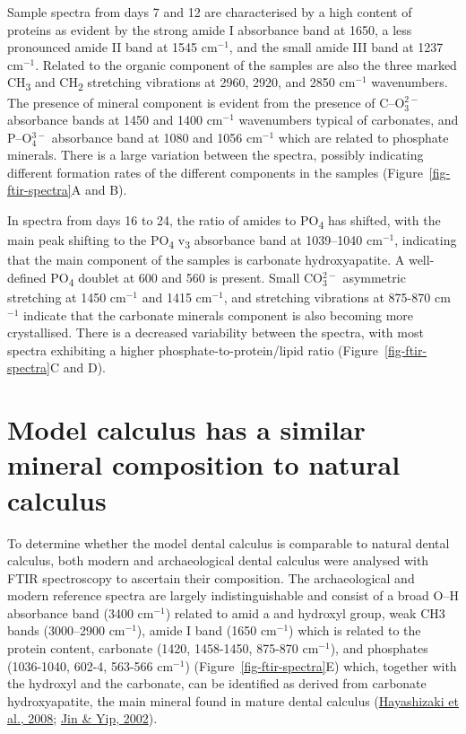 \documentclass[
  letterpaper,
]{book}
\begin{document}
Sample spectra from days 7 and 12 are characterised by a high content of
proteins as evident by the strong amide I absorbance band at 1650, a
less pronounced amide II band at 1545 cm\(^{-1}\), and the small amide
III band at 1237 cm\(^{-1}\). Related to the organic component of the
samples are also the three marked CH\textsubscript{3} and
CH\textsubscript{2} stretching vibrations at 2960, 2920, and 2850
cm\(^{-1}\) wavenumbers. The presence of mineral component is evident
from the presence of C--O\(^{2-}_3\) absorbance bands at 1450 and 1400
cm\(^{-1}\) wavenumbers typical of carbonates, and P--O\(^{3-}_4\)
absorbance band at 1080 and 1056 cm\(^{-1}\) which are related to
phosphate minerals. There is a large variation between the spectra,
possibly indicating different formation rates of the different
components in the samples (Figure~\ref{fig-ftir-spectra}A and B).

In spectra from days 16 to 24, the ratio of amides to
PO\textsubscript{4} has shifted, with the main peak shifting to the
PO\textsubscript{4} v\textsubscript{3} absorbance band at 1039--1040
cm\(^{-1}\), indicating that the main component of the samples is
carbonate hydroxyapatite. A well-defined PO\textsubscript{4} doublet at
600 and 560 is present. Small CO\(_3^{2-}\) asymmetric stretching at
1450 cm\(^{-1}\) and 1415 cm\(^{-1}\), and stretching vibrations at
875-870 cm\(^{-1}\) indicate that the carbonate minerals component is
also becoming more crystallised. There is a decreased variability
between the spectra, with most spectra exhibiting a higher
phosphate-to-protein/lipid ratio (Figure~\ref{fig-ftir-spectra}C and D).

\hypertarget{model-calculus-has-a-similar-mineral-composition-to-natural-calculus}{%
\section{Model calculus has a similar mineral composition to natural
calculus}\label{model-calculus-has-a-similar-mineral-composition-to-natural-calculus}}

To determine whether the model dental calculus is comparable to natural
dental calculus, both modern and archaeological dental calculus were
analysed with FTIR spectroscopy to ascertain their composition. The
archaeological and modern reference spectra are largely
indistinguishable and consist of a broad O--H absorbance band (3400
cm\(^{-1}\)) related to amid a and hydroxyl group, weak CH3 bands
(3000--2900 cm\(^{-1}\)), amide I band (1650 cm\(^{-1}\)) which is
related to the protein content, carbonate (1420, 1458-1450, 875-870
cm\(^{-1}\)), and phosphates (1036-1040, 602-4, 563-566 cm\(^{-1}\))
(Figure~\ref{fig-ftir-spectra}E) which, together with the hydroxyl and
the carbonate, can be identified as derived from carbonate
hydroxyapatite, the main mineral found in mature dental calculus
(\protect\hyperlink{ref-hayashizakiSiteSpecific2008}{Hayashizaki et al.,
2008}; \protect\hyperlink{ref-jinSupragingivalCalculus2002}{Jin \& Yip,
2002}).
\end{document}
